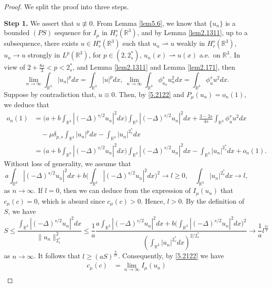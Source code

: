 \documentclass[11pt]{article}
\numberwithin{equation}{section}
\begin{document}
\begin{proof}  We split the proof into three steps.
\smallskip

\noindent\textbf{Step 1.} 
We assert that  $u\not\equiv 0$.
From Lemma {\ref{lem5.6}}, we  know that $\{u_n\}$ is a  bounded $(PS)$ sequence 
for $I_\mu$ in $H^s_r(\mathbb{R}^3)$, and by Lemma {\ref{lem2.1311}}, up to a 
subsequence, there exists $u\in H^s_r(\mathbb{R}^3)$ such that $u_n\rightharpoonup u$ 
weakly in $ H^s_r(\mathbb{R}^3)$, $u_n\to u$ strongly in $ L^p(\mathbb{R}^3)$, for 
$p\in (2, 2^*_s)$, $u_n(x)\rightharpoonup u(x)$ a.e.\ on $\mathbb{R}^3$. 
In view of $2+\frac{8s}{3}<p<2^*_s$, and Lemma {\ref{lem2.1311}} and  
Lemma {\ref{lem2.171}}, then
\begin{equation}\label{5.2122}
\lim_{n\to \infty}\int_{\mathbb{R}^3}|u_n|^pdx
=\int_{\mathbb{R}^3}|u|^pdx,~\lim_{n\to \infty}\int_{\mathbb{R}^3}
\phi^s_{u_n}u^2_ndx=\int_{\mathbb{R}^3}\phi^s_{u}u^2dx.
\end{equation}
Suppose by contradiction that, $u\equiv 0$. Then, by \eqref{5.2122} and 
$P_\mu(u_n)=o_n(1)$, we deduce that
\begin{align*}
o_n(1)&
= \Big(a+b\int_{\mathbb{R}^3}|(-\Delta)^{s/2}u_n|^2dx\Big)
 \int_{\mathbb{R}^3}|(-\Delta)^{s/2}u_n|^2dx
 +\frac{3-2s}{4s}\int_{\mathbb{R}^3}\phi^s_u u^2dx\\
&\quad -\mu \delta_{p,s}\int_{\mathbb{R}^3}|u_n|^pdx
 -\int_{\mathbb{R}^3}|u_n|^{2^*_s}dx\\
&= \Big(a+b\int_{\mathbb{R}^3}|(-\Delta)^{s/2}u_n|^2dx\Big)
 \int_{\mathbb{R}^3}|(-\Delta)^{s/2}u_n|^2dx
-\int_{\mathbb{R}^3}|u_n|^{2^*_s}dx+o_n(1).
\end{align*}
Without loss of generality, we assume that
$$
a\int_{\mathbb{R}^3}|(-\Delta)^{s/2}u_n|^2dx
+b\Big(\int_{\mathbb{R}^3}|(-\Delta)^{s/2}u_n|^2dx\Big)^2\to l\geq 0,\quad
\int_{\mathbb{R}^3}|u_n|^{2^*_s}dx\to l,
$$
as $n\to \infty$. If $l=0$, then we can deduce from the expression of $I_\mu(u_n)$ 
that $c_\mu(c)=0$, which is absurd since $c_\mu(c)>0$. Hence, $l>0$. 
By the definition of $S$, we have
$$
S\leq \frac{\int_{\mathbb{R}^3}|(-\Delta)^{s/2}u_n|^2dx}
{\|u_n\|^2_{2^*_s}}\leq \frac{1}{a}
\frac{a\int_{\mathbb{R}^3}|(-\Delta)^{s/2}u_n|^2dx
+b\Big(\int_{\mathbb{R}^3}|(-\Delta)^{s/2}u_n|^2dx\Big)^2}
{\left(\int_{\mathbb{R}^3}|u_n|^{2^*_s}
dx\right)^{2/2^*_s}}
\to \frac{1}{a}l^{\frac{2s}{3}}
$$
as $n\to \infty $. It follows that $l\geq (aS)^{\frac{3}{2s}}$. Consequently,
 by \eqref{5.2122} we have
\begin{align*}
c_\mu(c)
&= \lim_{n\to \infty}I_\mu(u_n)\\

\end{align*}
\end{proof}
\end{document}
